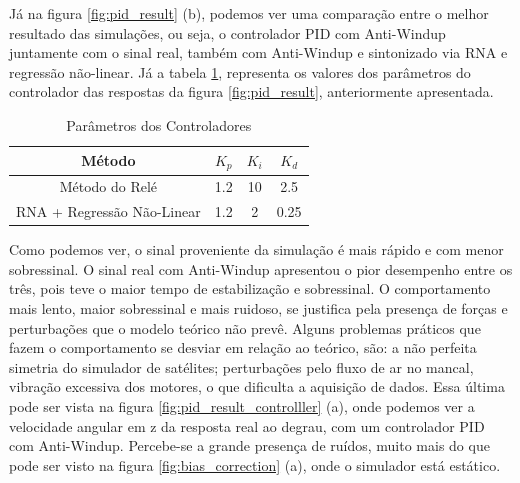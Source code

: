 Já na figura \ref{fig:pid_result} (b), podemos ver uma comparação entre o melhor resultado das simulações, ou seja, o controlador PID com Anti-Windup juntamente com o sinal real, também com Anti-Windup e sintonizado via RNA e regressão não-linear. Já a tabela \ref{tab:PIDParameters}, representa os valores dos parâmetros do controlador das respostas da figura \ref{fig:pid_result}, anteriormente apresentada.

\begin{table}[H]
  \caption{Parâmetros dos Controladores}
  \label{tab:PIDParameters}
  \centering%
  \begin{minipage}{.55\textwidth}
    \begin{tabular*}{\textwidth}{cccc}
      \hline
      Método                       & $K_p$ & $K_i$ & $K_d$\\ \hline
      \hline
      Método do Relé               & 1.2 & 10 & 2.5 \\ 
      RNA + Regressão Não-Linear   & 1.2 & 2 & 0.25 \\ \hline
    \end{tabular*}
  \end{minipage}
\end{table}

Como podemos ver, o sinal proveniente da simulação é mais rápido e com menor sobressinal. O sinal real com Anti-Windup apresentou o pior desempenho entre os três, pois teve o maior tempo de estabilização e sobressinal. O comportamento mais lento, maior sobressinal e mais ruidoso, se justifica pela presença de forças e perturbações que o modelo teórico não prevê. Alguns problemas práticos que fazem o comportamento se desviar em relação ao teórico, são: a não perfeita simetria do simulador de satélites; perturbações pelo fluxo de ar no mancal, vibração excessiva dos motores, o que dificulta a aquisição de dados. Essa última pode ser vista na figura \ref{fig:pid_result_controlller} (a), onde podemos ver a velocidade angular em z da resposta real ao degrau, com um controlador PID com Anti-Windup. Percebe-se a grande presença de ruídos, muito mais do que pode ser visto na figura \ref{fig:bias_correction} (a), onde o simulador está estático.

